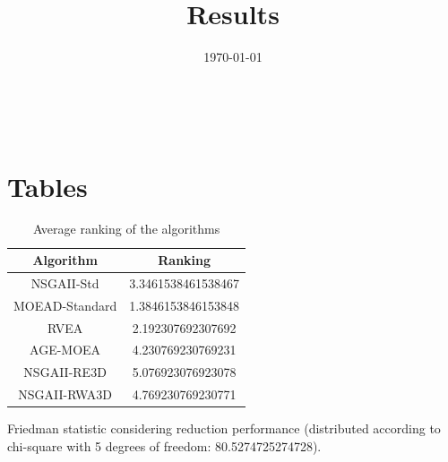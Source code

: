 \documentclass{article}
\title{Results}
\author{}
\date{\today}
\begin{document}
\oddsidemargin 0in \topmargin 0in\maketitle
\
\section{Tables}
\begin{table}[!htp]
\centering
\caption{Average ranking of the algorithms}
\begin{tabular}{c|c}
Algorithm&Ranking\\
\hline
NSGAII-Std&3.3461538461538467\\
MOEAD-Standard&1.3846153846153848\\
RVEA&2.192307692307692\\
AGE-MOEA&4.230769230769231\\
NSGAII-RE3D&5.076923076923078\\
NSGAII-RWA3D&4.769230769230771\\
\end{tabular}
\end{table}


Friedman statistic considering reduction performance (distributed according to chi-square with 5 degrees of freedom: 80.5274725274728).
\end{document}
